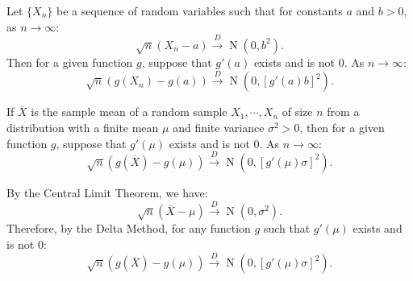 \documentclass{huhtakm-template-book-v2}
\DeclareMathOperator{\N}{N}
\begin{document}
    \begin{thm}
        Let $\{X_{n}\}$ be a sequence of random variables such that for constants $a$ and $b > 0$, as $n \to \infty$:
        \begin{equation*}
            \sqrt{n}(X_{n} - a) \xrightarrow{D} \N(0, b^{2}).
        \end{equation*}
        Then for a given function $g$, suppose that $g'(a)$ exists and is not $0$. As $n \to \infty$:
        \begin{equation*}
            \sqrt{n}(g(X_{n}) - g(a)) \xrightarrow{D} \N(0, [g'(a)b]^{2}).
        \end{equation*}
    \end{thm}
    \begin{cor}
        \label{Chapter 1 (Corollary) CLT for functions of random variables}
        If $\overline{X}$ is the sample mean of a random sample $X_{1}, \cdots, X_{n}$ of size $n$ from a distribution with a finite mean $\mu$ and finite variance $\sigma^{2} > 0$, then for a given function $g$, suppose that $g'(\mu)$ exists and is not $0$. As $n \to \infty$:
        \begin{equation*}
            \sqrt{n}(g(\overline{X}) - g(\mu)) \xrightarrow{D} \N(0, [g'(\mu)\sigma]^{2}).
        \end{equation*}  
    \end{cor}
    \begin{proofing}
        By the Central Limit Theorem, we have:
        \begin{equation*}
            \sqrt{n}(\overline{X} - \mu) \xrightarrow{D} \N(0, \sigma^{2}).
        \end{equation*}
        Therefore, by the Delta Method, for any function $g$ such that $g'(\mu)$ exists and is not $0$:
        \begin{equation*}
            \sqrt{n}(g(\overline{X}) - g(\mu)) \xrightarrow{D} \N(0, [g'(\mu)\sigma]^{2}).
        \end{equation*}
    \end{proofing}
    \newpage
\end{document}
